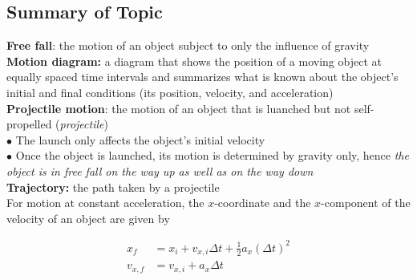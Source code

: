     \subsection{Summary of Topic}
        \textbf{Free fall}: the motion of an object subject to only the influence of gravity \\
        \textbf{Motion diagram:} a diagram that shows the position of a moving object at equally spaced time intervals and summarizes what is known about the object's initial and final conditions (its position, velocity,
        and acceleration) \\
        \textbf{Projectile motion}: the motion of an object that is luanched but not self-propelled (\textit{projectile}) \\
        $\bullet$ The launch only affects the object's initial velocity \\
        $\bullet$ Once the object is launched, its motion is determined by gravity only, hence \textit{the object is in free fall on the way up as well as on the way down} \\
        \textbf{Trajectory:} the path taken by a projectile \\

        For motion at constant acceleration, the $x$-coordinate and the $x$-component of the velocity of an object are given by

        \begin{align*}
            x_f     &= x_i + v_{x,i} \Delta t + \frac{1}{2} a_x (\Delta t)^2 \\
            v_{x,f} &= v_{x,i} + a_x \Delta t
        \end{align*}
